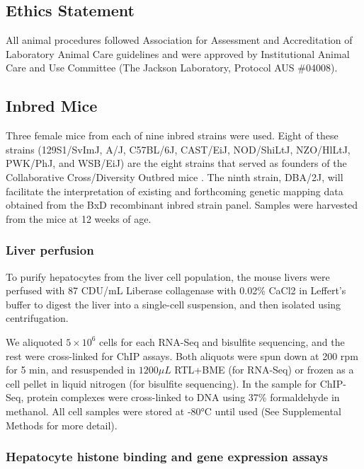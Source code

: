 \documentclass[
  11pt,
]{article}
\begin{document}
\hypertarget{ethics-statement}{%
\subsection{Ethics Statement}\label{ethics-statement}}

All animal procedures followed Association for Assessment and
Accreditation of Laboratory Animal Care guidelines and were approved by
Institutional Animal Care and Use Committee (The Jackson Laboratory,
Protocol AUS \#04008).

\hypertarget{inbred-mice}{%
\subsection{Inbred Mice}\label{inbred-mice}}

Three female mice from each of nine inbred strains were used. Eight of
these strains (129S1/SvImJ, A/J, C57BL/6J, CAST/EiJ, NOD/ShiLtJ,
NZO/HlLtJ, PWK/PhJ, and WSB/EiJ) are the eight strains that served as
founders of the Collaborative Cross/Diversity Outbred mice
\citep{Chesler:2008ge}. The ninth strain, DBA/2J, will facilitate the
interpretation of existing and forthcoming genetic mapping data obtained
from the BxD recombinant inbred strain panel. Samples were harvested
from the mice at 12 weeks of age.

\hypertarget{liver-perfusion}{%
\subsubsection{Liver perfusion}\label{liver-perfusion}}

To purify hepatocytes from the liver cell population, the mouse livers
were perfused with 87 CDU/mL Liberase collagenase with 0.02\% CaCl2 in
Leffert's buffer to digest the liver into a single-cell suspension, and
then isolated using centrifugation.

We aliquoted \(5 \times 10^{6}\) cells for each RNA-Seq and bisulfite
sequencing, and the rest were cross-linked for ChIP assays. Both
aliquots were spun down at 200 rpm for 5 min, and resuspended in
\(1200\mu L\) RTL+BME (for RNA-Seq) or frozen as a cell pellet in liquid
nitrogen (for bisulfite sequencing). In the sample for ChIP-Seq, protein
complexes were cross-linked to DNA using 37\% formaldehyde in methanol.
All cell samples were stored at -80°C until used (See Supplemental
Methods for more detail).

\hypertarget{hepatocyte-histone-binding-and-gene-expression-assays}{%
\subsubsection{Hepatocyte histone binding and gene expression
assays}\label{hepatocyte-histone-binding-and-gene-expression-assays}}
\end{document}
